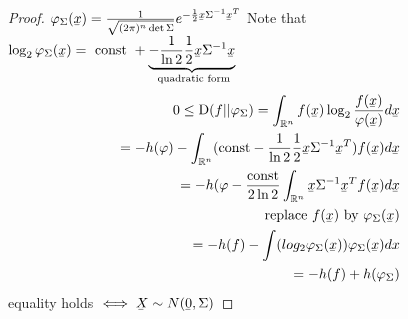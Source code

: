 \documentclass[mfit.tex]{subfiles}
\begin{document}
\begin{proof}
  $\varphi_\Sigma(\ubar{x}) = \frac{1}{\sqrt{(2 \pi)^n \det \Sigma}} e^{- \frac{1}{2} \ubar{x} \inv{\Sigma} \ubar{x}^T}$
  Note that $\log_2 \varphi_\Sigma (\ubar{x}) = \text{ const } + \underbrace{- \frac{1}{\ln 2} \frac{1}{2} \ubar{x} \inv{\Sigma} \ubar{x}}_{\text{ quadratic form}}$
  \begin{align*}
    0 \leq \KLdiv(f||\varphi_\Sigma) = \int_{\R^n} f(\ubar{x}) \log_2 \frac{f(\ubar{x})}{\varphi(\ubar{x})} d\ubar{x}\\
    = -h(\varphi) - \int_{\R^n} (\text{const} - \frac{1}{\ln 2} \frac{1}{2} \ubar{x} \inv{\Sigma} \ubar{x}^T) f(\ubar{x}) d \ubar{x}\\
    = -h(\varphi - \frac{\text{const}}{2 \ln 2} \int_{\R^n} \ubar{x} \inv{\Sigma} \ubar{x}^T f(\ubar{x}) d\ubar{x}\\
    \text{replace } f( \ubar{x}) \text{ by } \varphi_\Sigma(\ubar{x}) \\
    = -h(f) - \int (log_2 \varphi_\Sigma(\ubar{x})) \varphi_\Sigma(\ubar{x}) dx\\
    = - h(f) + h(\varphi_\Sigma)
  \end{align*}
  equality holds $\iff \ubar{X} \sim N(\ubar{0},\Sigma)$
\end{proof}
\end{document}
